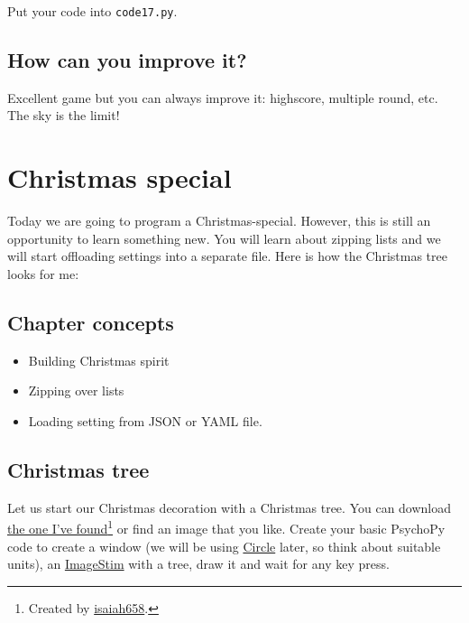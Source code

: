 \documentclass[
]{book}
\providecommand{\tightlist}{%
  \setlength{\itemsep}{0pt}\setlength{\parskip}{0pt}}
\begin{document}
Put your code into \texttt{code17.py}.

\hypertarget{how-can-you-improve-it}{%
\section{How can you improve it?}\label{how-can-you-improve-it}}

Excellent game but you can always improve it: highscore, multiple round, etc. The sky is the limit!

\hypertarget{christmas-special}{%
\chapter{Christmas special}\label{christmas-special}}

Today we are going to program a Christmas-special. However, this is still an opportunity to learn something new. You will learn about zipping lists and we will start offloading settings into a separate file. Here is how the Christmas tree looks for me:

\hypertarget{chapter-concepts-6}{%
\section{Chapter concepts}\label{chapter-concepts-6}}

\begin{itemize}
\tightlist
\item
  Building Christmas spirit
\item
  Zipping over lists
\item
  Loading setting from JSON or YAML file.
\end{itemize}

\hypertarget{christmas-tree}{%
\section{Christmas tree}\label{christmas-tree}}

Let us start our Christmas decoration with a Christmas tree. You can download \href{material/pine-tree.png}{the one I've found}\footnote{Created by \href{https://openclipart.org/artist/isaiah658}{isaiah658}.} or find an image that you like. Create your basic PsychoPy code to create a window (we will be using \href{https://psychopy.org/api/visual/circle.html\#psychopy.visual.circle.Circle}{Circle} later, so think about suitable units), an \href{https://psychopy.org/api/visual/imagestim.html\#psychopy.visual.ImageStim}{ImageStim} with a tree, draw it and wait for any key press.
\end{document}
